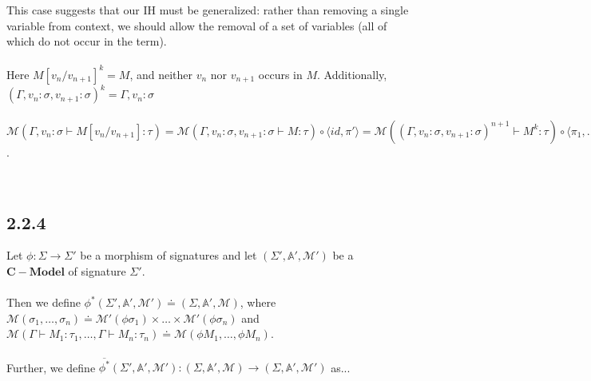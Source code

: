 \documentclass{article}
\newcommand{\mbf}{\mathbf}
\begin{document}
\begin{description}
\begin{description}
This case suggests that our IH must be generalized: rather than removing a single variable from context, we should
allow the removal of a set of variables (all of which do not occur in the term).\\~\\

Here $M[v_n/v_{n+1}]^k = M$, and neither $v_n$ nor $v_{n+1}$ occurs in $M$.
Additionally, $(\Gamma,v_n:\sigma,v_{n+1}:\sigma)^k = \Gamma,v_n:\sigma$\\~\\
$\mathcal M(\Gamma,v_n : \sigma \vdash M[v_n/v_{n+1}] : \tau) = \mathcal M(\Gamma,v_n : \sigma,v_{n+1} : \sigma \vdash M : \tau)
 \circ \langle id, \pi' \rangle = \mathcal M((\Gamma,v_n:\sigma,v_{n+1}:\sigma)^{n+1} \vdash M^k : \tau) \circ \langle \pi_1, \ldots, \pi_{n-1},\pi_{n+1} \rangle \circ \langle id, \pi' \rangle = \mathcal M(\Gamma,v_n : \sigma \vdash M : \tau) \circ 
\langle \pi_1, \ldots, \pi_{n-1},\pi_{n+1} \rangle \circ \langle id, \pi' \rangle = \mathcal M(\Gamma,v_n : \sigma \vdash M : \tau)
\circ a$.



\item[Case $k < n$:]~\\


\end{description}

\end{description}




\subsection*{2.2.4}

Let $\phi : \Sigma \to \Sigma'$ be a morphism of signatures and let $(\Sigma', \mathbb A', \mathcal M')$
be a $\mbf{C-Model}$ of signature $\Sigma'$.\\~\\

Then we define 
$\phi^*(\Sigma', \mathbb A', \mathcal M') \doteq (\Sigma, \mathbb A', \mathcal M)$, 
where $\mathcal M(\sigma_1, \ldots, \sigma_n) \doteq \mathcal M'(\phi \sigma_1) \times \ldots \times \mathcal M'(\phi \sigma_n) 
$ and $\mathcal M(\Gamma \vdash M_1 : \tau_1, \ldots, \Gamma \vdash M_n : \tau_n) \doteq 
\mathcal M(\phi M_1, \ldots, \phi M_n)$.\\~\\
Further, we define $\overline{\phi^*}(\Sigma', \mathbb A', \mathcal M') : (\Sigma,\mathbb A', \mathcal M) \to (\Sigma, \mathbb A', \mathcal M')$ as... 
\end{document}
